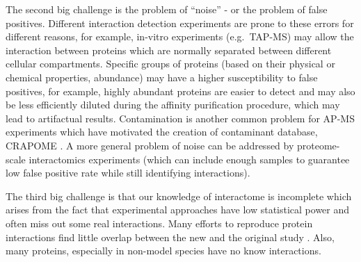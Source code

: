 \documentclass[12pt,]{report}
\begin{document}
The second big challenge is the problem of ``noise'' - or the problem of
false positives. Different interaction detection experiments are prone
to these errors for different reasons, for example, in-vitro experiments
(e.g.~TAP-MS) may allow the interaction between proteins which are
normally separated between different cellular compartments. Specific
groups of proteins (based on their physical or chemical properties,
abundance) may have a higher susceptibility to false positives, for
example, highly abundant proteins are easier to detect and may also be
less efficiently diluted during the affinity purification procedure,
which may lead to artifactual results. Contamination is another common
problem for AP-MS experiments which have motivated the creation of
contaminant database, CRAPOME \citep{Mellacheruvu:2013aa}. A more
general problem of noise can be addressed by proteome-scale
interactomics experiments (which can include enough samples to guarantee
low false positive rate while still identifying interactions).

The third big challenge is that our knowledge of interactome is
incomplete which arises from the fact that experimental approaches have
low statistical power and often miss out some real interactions. Many
efforts to reproduce protein interactions find little overlap between
the new and the original study \citep{Braun:2009aa}. Also, many
proteins, especially in non-model species have no know interactions.
\end{document}
